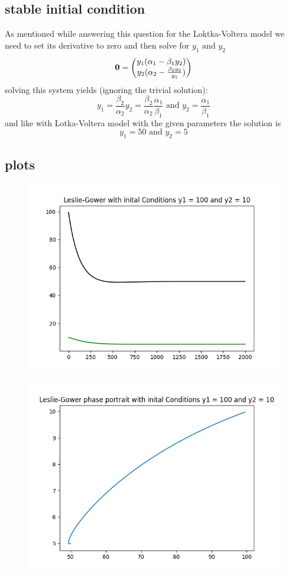 \documentclass{article}
\begin{document}
\subsection{stable initial condition}
As mentioned while answering this question for the Loktka-Voltera model we need to set its derivative to zero and then solve for $y_1 \text{ and }y_2$
$$
\bf{0} =
\begin{pmatrix}
	y_1(\alpha_1-\beta_1y_2) \\ y_2(\alpha_2-\frac{\beta_2y_2}{y_1})
\end{pmatrix}
$$ 
solving this system yields (ignoring the trivial solution):
$$y_1 = \frac{\beta_2}{\alpha_2}y_2 = \frac{\beta_2}{\alpha_2}\frac{\alpha_1}{\beta_1}\text{ and } y_2 = \frac{\alpha_1}{\beta_1}$$ 
and like with Lotka-Voltera model with the given  parameters  the solution is
$$
y_1 = 50 \text{ and }
y_2 = 5 
$$  
\subsection{plots}
\begin{figure}[hbt!]
	\centering
	\includegraphics[width=.75\linewidth]{LG_100_10.png}
	
	\label{fig: Leslie Gower }
\end{figure}

\begin{figure}[hbt!]
	\centering
	\includegraphics[width=.75\linewidth]{LG_phase_portrait.png}
	
	\label{fig: Leslie Gower Phase portrait}
\end{figure}
\end{document}
